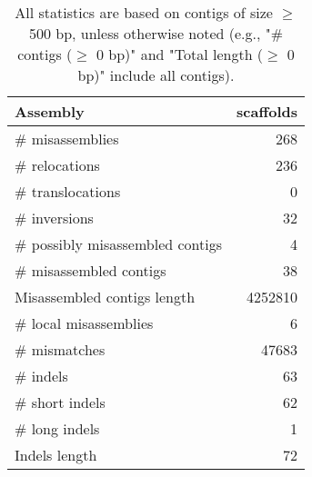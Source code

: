 \documentclass[12pt,a4paper]{article}
\begin{document}
\begin{table}[ht]
\begin{center}
\caption{All statistics are based on contigs of size $\geq$ 500 bp, unless otherwise noted (e.g., "\# contigs ($\geq$ 0 bp)" and "Total length ($\geq$ 0 bp)" include all contigs).}
\begin{tabular}{|l*{1}{|r}|}
\hline
Assembly & scaffolds \\ \hline
\# misassemblies & 268 \\ \hline
\hspace{5mm}\# relocations & 236 \\ \hline
\hspace{5mm}\# translocations & 0 \\ \hline
\hspace{5mm}\# inversions & 32 \\ \hline
\# possibly misassembled contigs & 4 \\ \hline
\# misassembled contigs & 38 \\ \hline
Misassembled contigs length & 4252810 \\ \hline
\# local misassemblies & 6 \\ \hline
\# mismatches & 47683 \\ \hline
\# indels & 63 \\ \hline
\hspace{5mm}\# short indels & 62 \\ \hline
\hspace{5mm}\# long indels & 1 \\ \hline
Indels length & 72 \\ \hline
\end{tabular}
\end{center}
\end{table}
\end{document}
